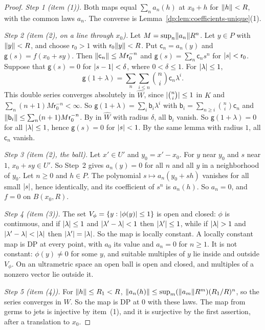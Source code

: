 \begin{proof}
\emph{Step 1 (item (1)).} Both maps equal $\sum_na_n(h)$ at $x_0+h$ for $\lVert h\rVert<R$, with the common laws $a_n$. The converse is Lemma~\ref{dp:lem:coefficients-unique}(1).

\emph{Step 2 (item (2), on a line through $x_0$).} Let $M=\sup_n\lVert a_n\rVert R^n$. Let $y\in P$ with $\lVert y\rVert<R$, and choose $\mathsf r_0>1$ with $\mathsf r_0\lVert y\rVert<R$. Put $\mathsf c_n=a_n(y)$ and $\mathsf g(s)=f(x_0+sy)$. Then $\lVert \mathsf c_n\rVert\le M\mathsf r_0^{-n}$ and $\mathsf g(s)=\sum_n\mathsf c_ns^n$ for $\lvert s\rvert<\mathsf r_0$. Suppose that $\mathsf g(s)=0$ for $\lvert s-1\rvert<\delta$, where $0<\delta\le1$. For $\lvert \lambda\rvert\le1$,
\[
 \mathsf g(1+\lambda)=\sum_n\sum_{i\le n}\binom ni \mathsf c_n\lambda^i.
\]
This double series converges absolutely in $\widehat W$, since $\lvert \binom ni\rvert\le1$ in $K$ and $\sum_n(n+1)M\mathsf r_0^{-n}<\infty$. So $\mathsf g(1+\lambda)=\sum_i\mathsf b_i\lambda^i$ with $\mathsf b_i=\sum_{n\ge i}\binom ni\mathsf c_n$ and $\lVert \mathsf b_i\rVert\le\sum_n(n+1)M\mathsf r_0^{-n}$. By \cite[Lemma~A.1]{I} in $\widehat W$ with radius $\delta$, all $\mathsf b_i$ vanish. So $\mathsf g(1+\lambda)=0$ for all $\lvert \lambda\rvert\le1$, hence $\mathsf g(s)=0$ for $\lvert s\rvert<1$. By the same lemma with radius $1$, all $\mathsf c_n$ vanish.

\emph{Step 3 (item (2), the ball).} Let $x'\in U'$ and $y_0=x'-x_0$. For $y$ near $y_0$ and $s$ near $1$, $x_0+sy\in U'$. So Step~2 gives $a_n(y)=0$ for all $n$ and all $y$ in a neighborhood of $y_0$. Let $n\ge0$ and $h\in P$. The polynomial $s\mapsto a_n(y_0+sh)$ vanishes for all small $\lvert s\rvert$, hence identically, and its coefficient of $s^n$ is $a_n(h)$. So $a_n=0$, and $f=0$ on $B(x_0,R)$.

\emph{Step 4 (item (3)).} The set $V_\phi=\{y:\lvert \phi(y)\rvert\le1\}$ is open and closed: $\phi$ is continuous, and if $\lvert \lambda\rvert\le1$ and $\lvert \lambda'-\lambda\rvert<1$ then $\lvert \lambda'\rvert\le1$, while if $\lvert \lambda\rvert>1$ and $\lvert \lambda'-\lambda\rvert<\lvert \lambda\rvert$ then $\lvert \lambda'\rvert=\lvert \lambda\rvert$. So the map is locally constant. A locally constant map is DP at every point, with $a_0$ its value and $a_n=0$ for $n\ge1$. It is not constant: $\phi(y)\ne0$ for some $y$, and suitable multiples of $y$ lie inside and outside $V_\phi$. On an ultrametric space an open ball is open and closed, and multiples of a nonzero vector lie outside it.

\emph{Step 5 (item (4)).} For $\lVert h\rVert\le R_1<R$, $\lVert a_n(h)\rVert\le\sup_m(\lVert a_m\rVert R^m)(R_1/R)^n$, so the series converges in $W$. So the map is DP at $0$ with these laws. The map from germs to jets is injective by item~(1), and it is surjective by the first assertion, after a translation to $x_0$.
\end{proof}

